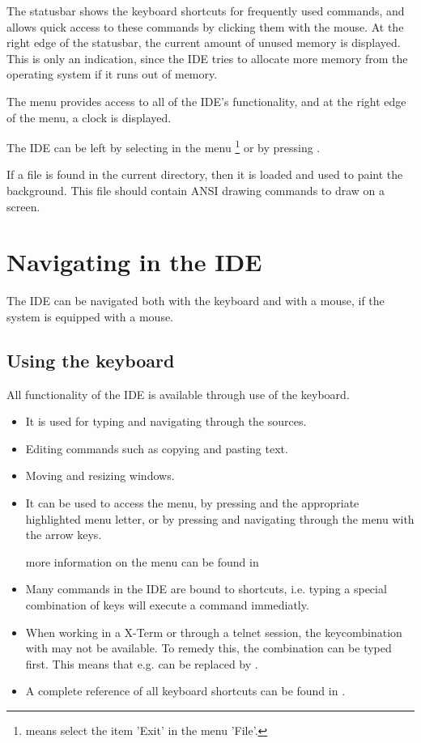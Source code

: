 The statusbar shows the keyboard shortcuts for frequently used 
commands, and allows quick access to these commands by clicking 
them with the mouse. 
At the right edge of the statusbar, the current amount of unused 
memory is displayed. This is only an indication, since the IDE 
tries to allocate more memory from the operating system if it 
runs out of memory.

The menu provides access to all of the IDE's functionality, and
at the right edge of the menu, a clock is displayed.

The IDE can be left by selecting  in the menu
\footnote{ means select the item 'Exit' in the menu 'File'.}
or by pressing .

\begin{remark}
If a file  is found in the current directory,
then it is loaded and used to paint the background.
This file should contain ANSI drawing commands to draw on a screen.
\end{remark}

\section{Navigating in the IDE}
The IDE can be navigated both with the keyboard and with a mouse, if the
system is equipped with a mouse.
%
%
\subsection{Using the keyboard} 
All functionality of the IDE is available through use of the keyboard.
\begin{itemize}
\item It is used for typing and navigating through the sources.
\item Editing commands such as copying and pasting text.
\item Moving and resizing windows.
\item It can be used to access the menu, by pressing  and the
appropriate highlighted menu letter, or by pressing  and
navigating through the menu with the arrow keys.

more information on the menu can be found in 
\item Many commands in the IDE are bound to shortcuts, i.e. typing a special
combination of keys will execute a command immediatly.
\end{itemize}
\begin{remark}
\begin{itemize}
\item When working in a \linux X-Term or through a telnet session, the
keycombination with  may not be available. To remedy this, the 
 combination can be typed first. This means that e.g. 
can be replaced by .
\item A complete reference of all keyboard shortcuts can be found in
.
\end{itemize}
\end{remark}
% 
%
